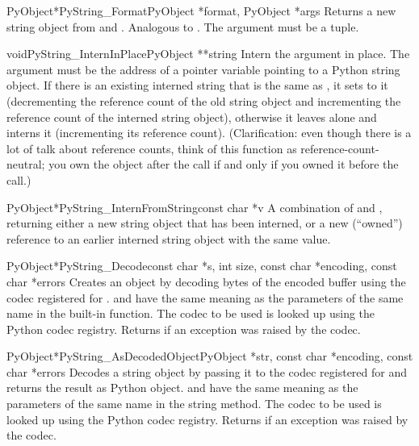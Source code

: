 \begin{cfuncdesc}{PyObject*}{PyString_Format}{PyObject *format,
                                              PyObject *args}
  Returns a new string object from  and .
  Analogous to .  The 
  argument must be a tuple.
\end{cfuncdesc}

\begin{cfuncdesc}{void}{PyString_InternInPlace}{PyObject **string}
  Intern the argument  in place.  The argument must be
  the address of a pointer variable pointing to a Python string
  object.  If there is an existing interned string that is the same as
  , it sets  to it (decrementing the
  reference count of the old string object and incrementing the
  reference count of the interned string object), otherwise it leaves
   alone and interns it (incrementing its reference
  count).  (Clarification: even though there is a lot of talk about
  reference counts, think of this function as reference-count-neutral;
  you own the object after the call if and only if you owned it before
  the call.)
\end{cfuncdesc}

\begin{cfuncdesc}{PyObject*}{PyString_InternFromString}{const char *v}
  A combination of  and
  , returning either a new string
  object that has been interned, or a new (``owned'') reference to an
  earlier interned string object with the same value.
\end{cfuncdesc}

\begin{cfuncdesc}{PyObject*}{PyString_Decode}{const char *s,
                                               int size,
                                               const char *encoding,
                                               const char *errors}
  Creates an object by decoding  bytes of the encoded
  buffer  using the codec registered for
  .   and  have the same
  meaning as the parameters of the same name in the
   built-in function.  The codec to be used is
  looked up using the Python codec registry.  Returns \NULL{} if
  an exception was raised by the codec.
\end{cfuncdesc}

\begin{cfuncdesc}{PyObject*}{PyString_AsDecodedObject}{PyObject *str,
                                               const char *encoding,
                                               const char *errors}
  Decodes a string object by passing it to the codec registered for
   and returns the result as Python
  object.  and  have the same meaning as the
  parameters of the same name in the string  method.
  The codec to be used is looked up using the Python codec registry.
  Returns \NULL{} if an exception was raised by the codec.
\end{cfuncdesc}

